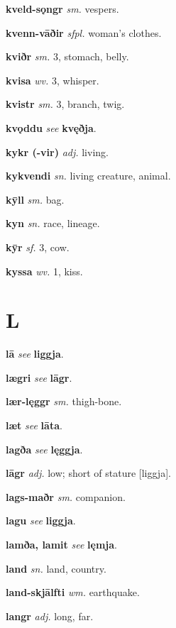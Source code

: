 \documentclass[12pt,letterpaper]{book}
\newcommand\emptypage{\clearpage{\pagestyle{empty}\cleardoublepage}}
\begin{document}
\noindent
\textbf{kveld-sǫngr} \textit{sm.} vespers.

\noindent
\textbf{kvenn-vāðir} \textit{sfpl.} woman's clothes.

\noindent
\textbf{kviðr} \textit{sm.} 3, stomach, belly.

\noindent
\textbf{kvisa} \textit{wv.} 3, whisper.

\noindent
\textbf{kvistr} \textit{sm.} 3, branch, twig.

\noindent
\textbf{kvǫddu} \textit{} \textit{see} \textbf{kvęðja}.

\noindent
\textbf{kykr (-vir)} \textit{adj.} living.

\noindent
\textbf{kykvendi} \textit{sn.} living creature, animal.

\noindent
\textbf{kȳll} \textit{sm.} bag.

\noindent
\textbf{kyn} \textit{sn.} race, lineage.

\noindent
\textbf{kȳr} \textit{sf.} 3, cow.

\noindent
\textbf{kyssa} \textit{wv.} 1, kiss.

\emptypage

\chapter*{L}

\noindent
\textbf{lā} \textit{} \textit{see} \textbf{liggja}.

\noindent
\textbf{lægri} \textit{} \textit{see} \textbf{lāgr}.

\noindent
\textbf{lær-lęggr} \textit{sm.} thigh-bone.

\noindent
\textbf{læt} \textit{} \textit{see} \textbf{lāta}.

\noindent
\textbf{lagða} \textit{} \textit{see} \textbf{lęggja}.

\noindent
\textbf{lāgr} \textit{adj.} low; short of stature [liggja].

\noindent
\textbf{lags-maðr} \textit{sm.} companion.

\noindent
\textbf{lagu} \textit{} \textit{see} \textbf{liggja}.

\noindent
\textbf{lamða, lamit} \textit{} \textit{see} \textbf{lęmja}.

\noindent
\textbf{land} \textit{sn.} land, country.

\noindent
\textbf{land-skjālfti} \textit{wm.} earthquake.

\noindent
\textbf{langr} \textit{adj.} long, far.
\end{document}
